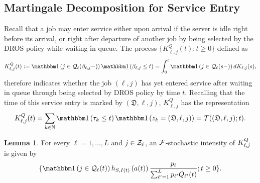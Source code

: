 \documentclass{article}
\theoremstyle{definition}
\newtheorem{lemma}[theorem]{Lemma}
\numberwithin{equation}{section}
\begin{document}
\subsection{Martingale Decomposition for Service Entry}

Recall that a job may enter service either upon arrival if the server is idle right before its arrival, or right after departure of another job by being selected by the DROS policy while waiting in queue. The process $\{K^Q_{\ell,j}(t);t\geq0\}$ defined as
\begin{equation}\label{def_KQ}
\entry^{Q}_{\ell,j}(t):= \indic{j\in\inque_\ell(\entrytime_{\ell,j}-)}\indic{\entrytime_{\ell,j}\leq t} = \int_0^t \indic{j\in\inque_\ell(s-)}d\entry_{\ell,j}(s),
\end{equation}
therefore indicates whether the job $(\ell,j)$ has yet entered service after waiting in queue through being selected by DROS policy by time $t$. Recalling that the time of this service entry is marked by $(\mathfrak{D},\ell,j)$, $K^Q_{\ell,j}$ has the representation
\begin{align}\label{Kl_marked}
  \entry_{\ell,j}^Q(t) = \sum_{k\in\N}\indic{\tau_k\leq t}\indic{z_k=(\mathfrak{D},\ell,j)} =  \mathcal{T}((\mathfrak{D},\ell,j);t).
\end{align}



\begin{lemma}\label{lem_Kintensity}
  For every $\ell=1,...,L$ and $j\in\mathcal{Z}_\ell$, an $\mathcal{F}$-stochastic intensity of $K^Q_{\ell,j}$ is given by
  \begin{equation}\label{Klj_decomposition}
    \{\indic{j\in\inque_\ell(t)} h_{S,\class(t)}\left(\age(t)\right) \frac{\weight_\ell}{\sum_{\ell'=1}^L\weight_{\ell'}\ql_{\ell'}(t)};t\geq0\}.
  \end{equation}
\end{lemma}
\end{document}
